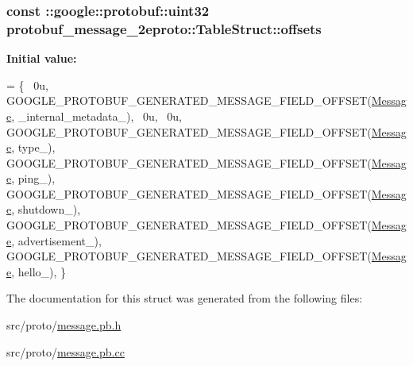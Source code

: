 \subsubsection[{\texorpdfstring{offsets}{offsets}}]{\setlength{\rightskip}{0pt plus 5cm}const \+::google\+::protobuf\+::uint32 protobuf\+\_\+message\+\_\+2eproto\+::\+Table\+Struct\+::offsets\hspace{0.3cm}{\ttfamily [static]}}\hypertarget{structprotobuf__message__2eproto_1_1_table_struct_a231499f7ef7234621ad122488be7e3ea}{}\label{structprotobuf__message__2eproto_1_1_table_struct_a231499f7ef7234621ad122488be7e3ea}
{\bfseries Initial value\+:}
\begin{DoxyCode}
= \{
  ~0u,  
  GOOGLE\_PROTOBUF\_GENERATED\_MESSAGE\_FIELD\_OFFSET(\hyperlink{class_message}{Message}, \_internal\_metadata\_),
  ~0u,  
  ~0u,  
  GOOGLE\_PROTOBUF\_GENERATED\_MESSAGE\_FIELD\_OFFSET(\hyperlink{class_message}{Message}, type\_),
  GOOGLE\_PROTOBUF\_GENERATED\_MESSAGE\_FIELD\_OFFSET(\hyperlink{class_message}{Message}, ping\_),
  GOOGLE\_PROTOBUF\_GENERATED\_MESSAGE\_FIELD\_OFFSET(\hyperlink{class_message}{Message}, shutdown\_),
  GOOGLE\_PROTOBUF\_GENERATED\_MESSAGE\_FIELD\_OFFSET(\hyperlink{class_message}{Message}, advertisement\_),
  GOOGLE\_PROTOBUF\_GENERATED\_MESSAGE\_FIELD\_OFFSET(\hyperlink{class_message}{Message}, hello\_),
\}
\end{DoxyCode}


The documentation for this struct was generated from the following files\+:\begin{DoxyCompactItemize}
\item 
src/proto/\hyperlink{message_8pb_8h}{message.\+pb.\+h}\item 
src/proto/\hyperlink{message_8pb_8cc}{message.\+pb.\+cc}\end{DoxyCompactItemize}
